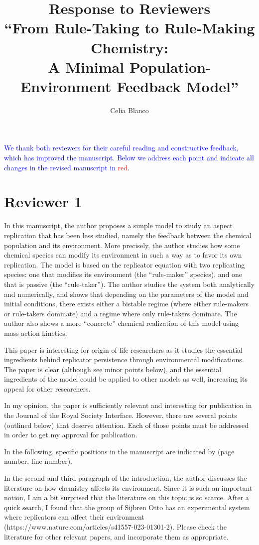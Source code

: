\documentclass[11pt]{article}
\title{Response to Reviewers\\[6pt]
\large ``From Rule-Taking to Rule-Making Chemistry:\\
A Minimal Population-Environment Feedback Model''}
\author{Celia Blanco}
\date{}
\newcommand{\rev}[1]{\textcolor{red}{#1}}
\newcommand{\ans}[1]{\textcolor{blue}{#1}}
\newcommand{\RC}[1]{\medskip\noindent #1\par}
\begin{document}
\maketitle

\ans{We thank both reviewers for their careful reading and constructive feedback, which has improved the manuscript. Below we address each point and indicate all changes in the revised manuscript in} \rev{red}.

\section*{Reviewer 1}

\RC{In this manuscript, the author proposes a simple model to study an aspect replication that has been less studied, namely the feedback between the chemical population and its environment. More precisely, the author studies how some chemical species can modify its environment in such a way as to favor its own replication. The model is based on the replicator equation with two replicating species: one that modifies its environment (the ``rule-maker'' species), and one that is passive (the ``rule-taker''). The author studies the system both analytically and numerically, and shows that depending on the parameters of the model and initial conditions, there exists either a bistable regime (where either rule-makers or rule-takers dominate) and a regime where only rule-takers dominate. The author also shows a more ``concrete'' chemical realization of this model using mass-action kinetics.\par
This paper is interesting for origin-of-life researchers as it studies the essential ingredients behind replicator persistence through environmental modifications. The paper is clear (although see minor points below), and the essential ingredients of the model could be applied to other models as well, increasing its appeal for other researchers.\par
In my opinion, the paper is sufficiently relevant and interesting for publication in the Journal of the Royal Society Interface. However, there are several points (outlined below) that deserve attention. Each of those points must be addressed in order to get my approval for publication.\par
In the following, specific positions in the manuscript are indicated by (page number, line number).}

\RC{In the second and third paragraph of the introduction, the author discusses the literature on how chemistry affects its environment. Since it is such an important notion, I am a bit surprised that the literature on this topic is so scarce. After a quick search, I found that the group of Sijbren Otto has an experimental system where replicators can affect their environment (https://www.nature.com/articles/s41557-023-01301-2). Please check the literature for other relevant papers, and incorporate them as appropriate.}
\end{document}
